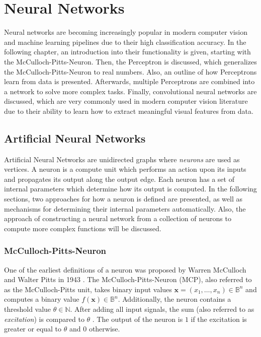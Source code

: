 \section{Neural Networks}
\label{sec:neural_networks}
Neural networks are becoming increasingly popular in modern computer vision and machine learning pipelines due to their high classification accuracy.
In the following chapter, an introduction into their functionality is given, starting with the McCulloch-Pitts-Neuron.
Then, the Perceptron is discussed, which generalizes the McCulloch-Pitts-Neuron to real numbers.
Also, an outline of how Perceptrons learn from data is presented.
Afterwards, multiple Perceptrons are combined into a network to solve more complex tasks.
Finally, convolutional neural networks are discussed, which are very commonly used in modern computer vision literature due to their ability to learn how to extract meaningful visual features from data.

\subsection{Artificial Neural Networks}
Artificial Neural Networks are unidirected graphs where \textit{neurons} are used as vertices.
A neuron is a compute unit which performs an action upon its inputs and propagates its output along the output edge.
Each neuron has a set of internal parameters which determine how its output is computed.
In the following sections, two approaches for how a neuron is defined are presented, as well as mechanisms for determining their internal parameters automatically.
Also, the approach of constructing a neural network from a collection of neurons to compute more complex functions will be discussed.

\subsubsection{McCulloch-Pitts-Neuron}
\label{sec:mcculloch-pitts}
One of the earliest definitions of a neuron was proposed by Warren McCulloch and Walter Pitts in 1943 \cite{mcculloch_logical_1943}.
The McCulloch-Pitts-Neuron (MCP), also referred to as the McCulloch-Pitts unit, takes binary input values $\bm{x} = (x_1, \dots, x_n) \in \mathbb{B}^n$ and computes a binary value $f(\bm{x}) \in \mathbb{B}^n$.
Additionally, the neuron contains a threshold value $\theta \in \mathbb{N}$.
After adding all input signals, the sum (also referred to as \textit{excitation}) is compared to $\theta$ .
The output of the neuron is $1$ if the excitation is greater or equal to $\theta$ and $0$ otherwise.

